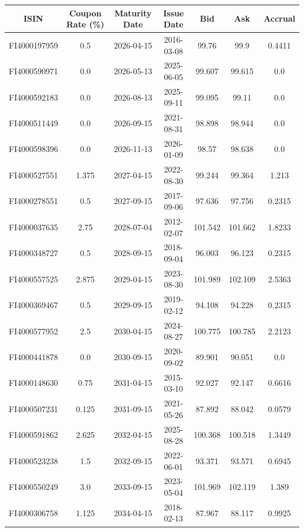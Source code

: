 \documentclass[a4paper]{artikel3}
\numberwithin{equation}{section}
\numberwithin{theorem}{section}
\numberwithin{proposition}{section}
\numberwithin{lemma}{section}
\begin{document}
\begin{table}[h!]
    \centering
    \begin{tabular}{| c | c | c | c | c | c | c |} 
\hline
ISIN & Coupon Rate (\%) & Maturity Date & Issue Date & Bid & Ask & Accrual \\
\hline
\hline
FI4000197959 & 0.5 & 2026-04-15 & 2016-03-08 & 99.76 & 99.9 & 0.4411 \\
\hline
FI4000590971 & 0.0 & 2026-05-13 & 2025-06-05 & 99.607 & 99.615 & 0.0 \\
\hline
FI4000592183 & 0.0 & 2026-08-13 & 2025-09-11 & 99.095 & 99.11 & 0.0 \\
\hline
FI4000511449 & 0.0 & 2026-09-15 & 2021-08-31 & 98.898 & 98.944 & 0.0 \\
\hline
FI4000598396 & 0.0 & 2026-11-13 & 2026-01-09 & 98.57 & 98.638 & 0.0 \\
\hline
FI4000527551 & 1.375 & 2027-04-15 & 2022-08-30 & 99.244 & 99.364 & 1.213 \\
\hline
FI4000278551 & 0.5 & 2027-09-15 & 2017-09-06 & 97.636 & 97.756 & 0.2315 \\
\hline
FI4000037635 & 2.75 & 2028-07-04 & 2012-02-07 & 101.542 & 101.662 & 1.8233 \\
\hline
FI4000348727 & 0.5 & 2028-09-15 & 2018-09-04 & 96.003 & 96.123 & 0.2315 \\
\hline
FI4000557525 & 2.875 & 2029-04-15 & 2023-08-30 & 101.989 & 102.109 & 2.5363 \\
\hline
FI4000369467 & 0.5 & 2029-09-15 & 2019-02-12 & 94.108 & 94.228 & 0.2315 \\
\hline
FI4000577952 & 2.5 & 2030-04-15 & 2024-08-27 & 100.775 & 100.785 & 2.2123 \\
\hline
FI4000441878 & 0.0 & 2030-09-15 & 2020-09-02 & 89.901 & 90.051 & 0.0 \\
\hline
FI4000148630 & 0.75 & 2031-04-15 & 2015-03-10 & 92.027 & 92.147 & 0.6616 \\
\hline
FI4000507231 & 0.125 & 2031-09-15 & 2021-05-26 & 87.892 & 88.042 & 0.0579 \\
\hline
FI4000591862 & 2.625 & 2032-04-15 & 2025-08-28 & 100.368 & 100.518 & 1.3449 \\
\hline
FI4000523238 & 1.5 & 2032-09-15 & 2022-06-01 & 93.371 & 93.571 & 0.6945 \\
\hline
FI4000550249 & 3.0 & 2033-09-15 & 2023-05-04 & 101.969 & 102.119 & 1.389 \\
\hline
FI4000306758 & 1.125 & 2034-04-15 & 2018-02-13 & 87.967 & 88.117 & 0.9925 \\

\end{tabular}
\end{table}
\end{document}
